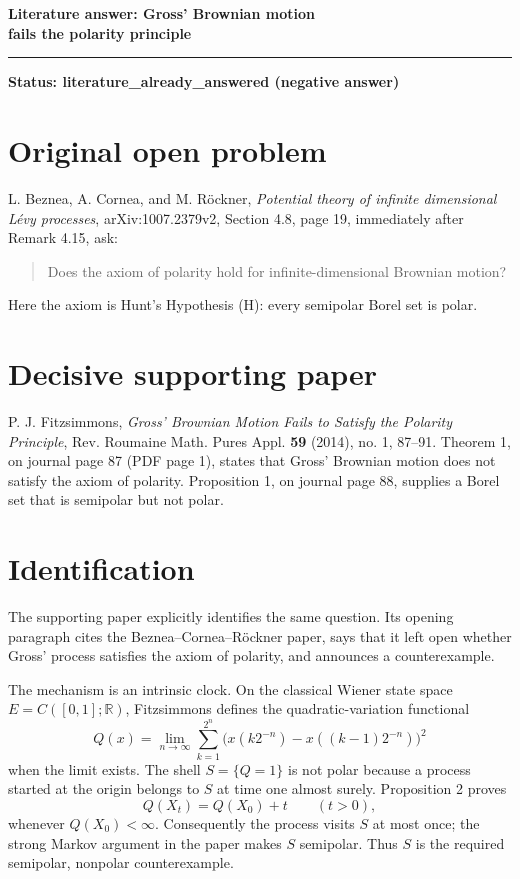 \documentclass[11pt]{article}
\newcommand{\statusbox}[1]{%
  \begin{center}
  \colorbox{panel}{\parbox{0.91\linewidth}{\centering\color{accent}\bfseries #1}}
  \end{center}}
\begin{document}
{\Large\bfseries Literature answer: Gross' Brownian motion\\[-0.1em]
fails the polarity principle\par}

\vspace{0.35em}
{\color{accent}\rule{\linewidth}{1.1pt}}

\statusbox{Status: literature\_already\_answered (negative answer)}

\section*{Original open problem}

L. Beznea, A. Cornea, and M. R\"ockner, \emph{Potential theory of infinite
dimensional L\'evy processes}, arXiv:1007.2379v2, Section 4.8, page 19,
immediately after Remark 4.15, ask:

\begin{quote}
Does the axiom of polarity hold for infinite-dimensional Brownian motion?
\end{quote}

Here the axiom is Hunt's Hypothesis (H): every semipolar Borel set is polar.

\section*{Decisive supporting paper}

P. J. Fitzsimmons, \emph{Gross' Brownian Motion Fails to Satisfy the Polarity
Principle}, Rev. Roumaine Math. Pures Appl. \textbf{59} (2014), no. 1,
87--91. Theorem 1, on journal page 87 (PDF page 1), states that Gross'
Brownian motion does not satisfy the axiom of polarity. Proposition 1, on
journal page 88, supplies a Borel set that is semipolar but not polar.

\section*{Identification}

The supporting paper explicitly identifies the same question. Its opening
paragraph cites the Beznea--Cornea--R\"ockner paper, says that it left open
whether Gross' process satisfies the axiom of polarity, and announces a
counterexample.

The mechanism is an intrinsic clock. On the classical Wiener state space
$E=C([0,1];\mathbb R)$, Fitzsimmons defines the quadratic-variation functional
\[
 Q(x)=\lim_{n\to\infty}\sum_{k=1}^{2^n}
 \bigl(x(k2^{-n})-x((k-1)2^{-n})\bigr)^2
\]
when the limit exists. The shell $S=\{Q=1\}$ is not polar because a process
started at the origin belongs to $S$ at time one almost surely. Proposition 2
proves
\[
 Q(X_t)=Q(X_0)+t \qquad (t>0),
\]
whenever $Q(X_0)<\infty$. Consequently the process visits $S$ at most once;
the strong Markov argument in the paper makes $S$ semipolar. Thus $S$ is the
required semipolar, nonpolar counterexample.
\end{document}
